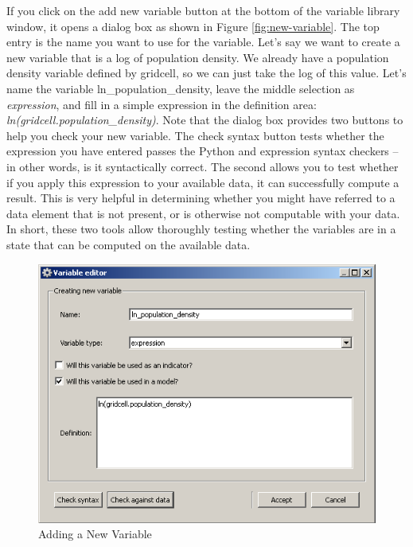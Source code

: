 If you click on the add new variable button at the bottom of the variable library window, it opens a dialog box as shown in Figure \ref{fig:new-variable}.  The top entry is the name you want to use for the variable.  Let's say we want to create a new variable that is a log of population density.  We already have a population density variable defined by gridcell, so we can just take the log of this value.  Let's name the variable ln\_population\_density, leave the middle selection as \emph{expression}, and fill in a simple expression in the definition area: \emph{ln(gridcell.population_density)}.  Note that the dialog box provides two buttons to help you check your new variable.  The check syntax button tests whether the expression you have entered passes the Python and expression syntax checkers -- in other words, is it syntactically correct.  The second allows you to test whether if you apply this expression to your available data, it can successfully compute a result.  This is very helpful in determining whether you might have referred to a data element that is not present, or is otherwise not computable with your data.  In short, these two tools allow thoroughly testing whether the variables are in a state that can be computed on the available data.

\begin{figure}[htp]
\begin{center}
\includegraphics[scale=0.6]{part-gui/images/model-manager-variable-library-new-variable.png}
\end{center}
\caption{Adding a New Variable}
\label{fig:variable-library-new-variable}
\end{figure}